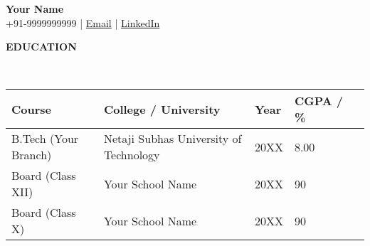 \documentclass[11pt,article]{article}
\newcommand{\resheading}[1]{{\small \colorbox{mygrey} { \begin{minipage}{0.99\textwidth}{\textbf{#1 \vphantom{p\^{E}}}}\end{minipage}}}}
\begin{document}
\begin{table}
    \begin{minipage}{0\linewidth}
        \centering
    \end{minipage}
    \begin{minipage}{1\linewidth}
        \centering
        \def\arraystretch{1}
        \textbf{\Large{Your Name}}\\ \vspace{0.4em}
        +91-9999999999 |
        \href{mailto:your.email@example.com}{Email} |
        \href{https://www.linkedin.com/in/}{LinkedIn}
    \end{minipage}\hfill
\end{table}
\setlength{\tabcolsep}{18pt}

\begin{table}
\centering
\resheading{\textbf{EDUCATION} }\\
\vspace{0.4em}
\begin{tabular}{lllll}
\textbf{Course}    & \textbf{College / University}     & \textbf{Year}     & \textbf{CGPA / \%} \\ 
\toprule
B.Tech (Your Branch)   & Netaji Subhas University of Technology  & 20XX   & 8.00 \\  
Board (Class XII)      & Your School Name & 20XX & 90  \\ 
Board (Class X)        & Your School Name & 20XX & 90
\vspace{-0.8em}
\end{tabular}
\end{table}
\end{document}
